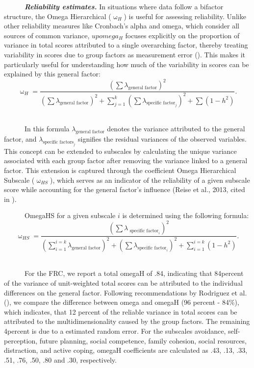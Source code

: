 \documentclass[
  man,floatsintext]{apa7}
\begin{document}
~~~~~~\textbf{\emph{Reliability estimates.}} In situations where data follow a bifactor structure, the Omega Hierarchical (\(\upomega_{H}\)) is useful for assessing reliability. Unlike other reliability measures like Cronbach's alpha and omega, which consider all sources of common variance, \(upomega_{H}\) focuses explicitly on the proportion of variance in total scores attributed to a single overarching factor, thereby treating variability in scores due to group factors as measurement error (). This makes it particularly useful for understanding how much of the variability in scores can be explained by this general factor: \[ \upomega_H = \frac{ ( \sum \lambda_{\text{general factor}})^2}{( \sum \lambda_{\text{general factor}})^2 + \sum_{j=1}^{k} (\sum \lambda_{\text{specific factor}_j})^2 + \sum(1-h^2)}. \]\\
\strut ~~~~~~In this formula \(\lambda_{\text{general factor}}\) denotes the variance attributed to the general factor, and \(\lambda_{\text{specific factors}_j}\) signifies the residual variances of the observed variables. This concept can be extended to subscales by calculating the unique variance associated with each group factor after removing the variance linked to a general factor. This extension is captured through the coefficient Omega Hierarchical Subscale (\(\upomega_{HS}\)), which serves as an indicator of the reliability of a given subscale score while accounting for the general factor's influence (Reise et al., 2013, cited in ).

~~~~~~OmegaHS for a given subscale \(i\) is determined using the following formula: \[ \upomega_{HS} = \frac{(\sum \lambda_{\text{ specific factor}_i})^2}{(\sum_{i=1}^{i=k} \lambda_{\text{general factor}})^2 + (\sum \lambda_{\text{specific factor}_i})^2 + \sum_{i=1}^{i=k}(1-h^2)}. \]\\
\strut ~~~~~~For the FRC, we report a total omegaH of .84, indicating that 84percent of the variance of unit-weighted total scores can be attributed to the individual differences on the general factor. Following recommendations by Rodriguez et al. (), we compare the difference between omega and omegaH (96 percent - 84\%), which indicates, that 12 percent of the reliable variance in total scores can be attributed to the multidimensionality caused by the group factors. The remaining 4percent is due to a estimated random error. For the subscales avoidance, self-perception, future planning, social competence, family cohesion, social resources, distraction, and active coping, omegaH coefficients are calculated as .43, .13, .33, .51, .76, .50, .80 and .30, respectively.
\end{document}
